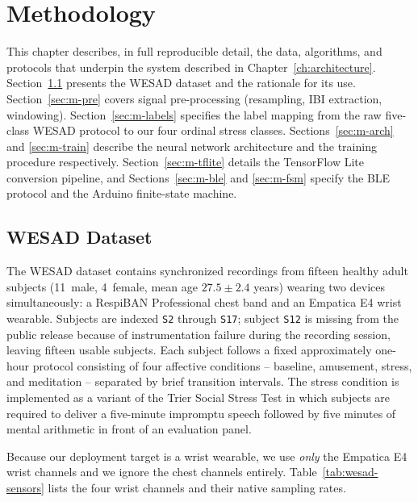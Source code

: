 \chapter{Methodology}
\label{ch:methodology}

This chapter describes, in full reproducible detail, the data,
algorithms, and protocols that underpin the system described in
Chapter~\ref{ch:architecture}. Section~\ref{sec:m-wesad} presents
the WESAD dataset and the rationale for its use. Section~\ref{sec:m-pre}
covers signal pre-processing (resampling, IBI extraction, windowing).
Section~\ref{sec:m-labels} specifies the label mapping from the raw
five-class WESAD protocol to our four ordinal stress classes.
Sections~\ref{sec:m-arch} and \ref{sec:m-train} describe the neural
network architecture and the training procedure respectively.
Section~\ref{sec:m-tflite} details the TensorFlow Lite conversion
pipeline, and Sections~\ref{sec:m-ble} and \ref{sec:m-fsm} specify
the BLE protocol and the Arduino finite-state machine.

\section{WESAD Dataset}
\label{sec:m-wesad}

The WESAD dataset \citep{schmidt2018wesad} contains synchronized
recordings from fifteen healthy adult subjects (11~male, 4~female,
mean age $27.5 \pm 2.4$ years) wearing two devices simultaneously: a
RespiBAN Professional chest band and an Empatica E4 wrist wearable.
Subjects are indexed \texttt{S2} through \texttt{S17}; subject
\texttt{S12} is missing from the public release because of
instrumentation failure during the recording session, leaving
fifteen usable subjects. Each subject follows a fixed approximately
one-hour protocol consisting of four affective conditions -- baseline,
amusement, stress, and meditation -- separated by brief transition
intervals. The stress condition is implemented as a variant of the
Trier Social Stress Test in which subjects are required to deliver
a five-minute impromptu speech followed by five minutes of mental
arithmetic in front of an evaluation panel.

Because our deployment target is a wrist wearable, we use
\emph{only} the Empatica E4 wrist channels and we ignore the chest
channels entirely. Table~\ref{tab:wesad-sensors} lists the four
wrist channels and their native sampling rates.

